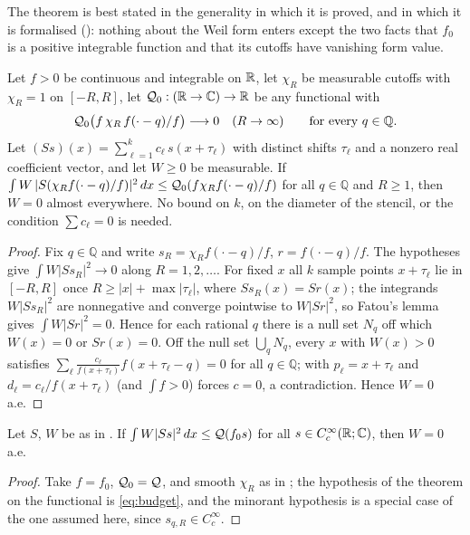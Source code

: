 The theorem is best stated in the generality in which it is proved, and in which it is formalised (): nothing
about the Weil form enters except the two facts that $f_0$ is a positive integrable function and that its cutoffs have vanishing
form value.

\begin{theorem}\label{thm:nominorant}
Let $f>0$ be continuous and integrable on $\mathbb R$, let $\chi_R$ be measurable cutoffs with $\chi_R=1$ on $[-R,R]$, let
$\mathcal Q_0:(\mathbb R\to\mathbb C)\to\mathbb R$ be any functional with
\[
 \mathcal Q_0\bigl(f\,\chi_R\,f(\cdot-q)/f\bigr)\longrightarrow0\quad(R\to\infty)\qquad\text{for every }q\in\mathbb Q .
\]
Let $(Ss)(x)=\sum_{\ell=1}^kc_\ell\,s(x+\tau_\ell)$ with distinct shifts $\tau_\ell$ and a nonzero real coefficient
vector, and let $W\ge0$ be measurable. If $\int W\,|S(\chi_Rf(\cdot-q)/f)|^2\,dx\le\mathcal Q_0(f\chi_Rf(\cdot-q)/f)$ for all $q\in\mathbb Q$ and
$R\ge1$, then $W=0$ almost everywhere. No bound on $k$, on the diameter of the stencil, or the condition $\sum c_\ell=0$ is needed.
\end{theorem}
\begin{proof}
Fix $q\in\mathbb Q$ and write $s_R=\chi_Rf(\cdot-q)/f$, $r=f(\cdot-q)/f$. The hypotheses give $\int W|Ss_R|^2\to0$ along $R=1,2,\dots$.
For fixed $x$ all $k$ sample points $x+\tau_\ell$ lie in $[-R,R]$ once $R\ge|x|+\max|\tau_\ell|$, where $Ss_R(x)=Sr(x)$; the integrands
$W|Ss_R|^2$ are nonnegative and converge pointwise to $W|Sr|^2$, so Fatou's lemma gives $\int W|Sr|^2=0$. Hence for each rational $q$
there is a null set $N_q$ off which $W(x)=0$ or $Sr(x)=0$. Off the null set $\bigcup_qN_q$, every $x$ with $W(x)>0$ satisfies
$\sum_\ell\frac{c_\ell}{f(x+\tau_\ell)}f(x+\tau_\ell-q)=0$ for all $q\in\mathbb Q$;  with $p_\ell=x+\tau_\ell$ and
$d_\ell=c_\ell/f(x+\tau_\ell)$ (and $\int f>0$) forces $c=0$, a contradiction. Hence $W=0$ a.e.
\end{proof}

\begin{corollary}\label{cor:nominorantWeil}
Let $S$, $W$ be as in . If $\int W|Ss|^2\,dx\le\mathcal Q(f_0s)$ for all $s\in C_c^\infty(\mathbb R;\mathbb C)$, then $W=0$ a.e.
\end{corollary}
\begin{proof}
Take $f=f_0$, $\mathcal Q_0=\mathcal Q$, and smooth $\chi_R$ as in ; the hypothesis of the theorem on the functional is \eqref{eq:budget},
and the minorant hypothesis is a special case of the one assumed here, since $s_{q,R}\in C_c^\infty$.
\end{proof}


